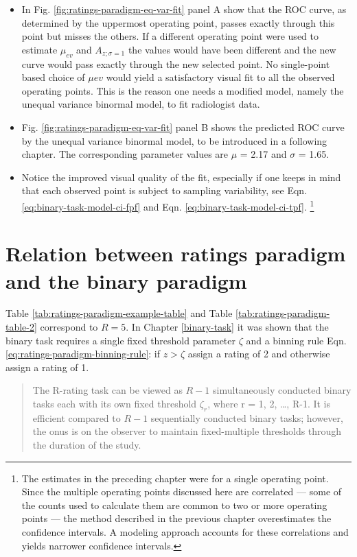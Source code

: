 \documentclass[
]{book}
\begin{document}
\begin{itemize}
\item
  In Fig. \ref{fig:ratings-paradigm-eq-var-fit} panel A show that the ROC curve, as determined by the uppermost operating point, passes exactly through this point but misses the others. If a different operating point were used to estimate \(\mu_{ev}\) and \(A_{z;\sigma = 1}\) the values would have been different and the new curve would pass exactly through the new selected point. No single-point based choice of \(\mu{ev}\) would yield a satisfactory visual fit to all the observed operating points. This is the reason one needs a modified model, namely the unequal variance binormal model, to fit radiologist data.
\item
  Fig. \ref{fig:ratings-paradigm-eq-var-fit} panel B shows the predicted ROC curve by the unequal variance binormal model, to be introduced in a following chapter. The corresponding parameter values are \(\mu\) = 2.17 and \(\sigma\) = 1.65.
\item
  Notice the improved visual quality of the fit, especially if one keeps in mind that each observed point is subject to sampling variability, see Eqn. \eqref{eq:binary-task-model-ci-fpf} and Eqn. \eqref{eq:binary-task-model-ci-tpf}. \footnote{The estimates in the preceding chapter were for a single operating point. Since the multiple operating points discussed here are correlated --- some of the counts used to calculate them are common to two or more operating points --- the method described in the previous chapter overestimates the confidence intervals. A modeling approach accounts for these correlations and yields narrower confidence intervals.}
\end{itemize}

\hypertarget{ratings-task-relation-binary-to-rating}{%
\section{Relation between ratings paradigm and the binary paradigm}\label{ratings-task-relation-binary-to-rating}}

Table \ref{tab:ratings-paradigm-example-table} and Table \ref{tab:ratings-paradigm-table-2} correspond to \(R = 5\). In Chapter \ref{binary-task} it was shown that the binary task requires a single fixed threshold parameter \(\zeta\) and a binning rule Eqn. \eqref{eq:ratings-paradigm-binning-rule}: if \(z > \zeta\) assign a rating of 2 and otherwise assign a rating of 1.

\begin{quote}
The R-rating task can be viewed as \(R-1\) simultaneously conducted binary tasks each with its own fixed threshold \(\zeta_r\), where r = 1, 2, \ldots, R-1. It is efficient compared to \(R-1\) sequentially conducted binary tasks; however, the onus is on the observer to maintain fixed-multiple thresholds through the duration of the study.
\end{quote}
\end{document}
